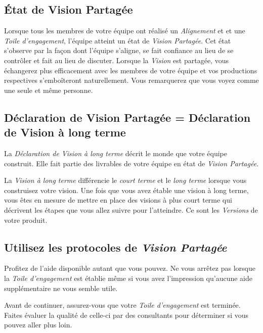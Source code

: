 \documentclass[paper=6in:9in,pagesize=pdftex,headinclude=on,footinclude=on,11pt]{scrbook}
\begin{document}
\subsection{État de Vision Partagée}

Lorsque tous les membres de votre équipe ont réalisé un \emph{Alignement} et et une \emph{Toile d'engagement}, l'équipe atteint un état
de \emph{Vision Partagée}. Cet état s'observe par la façon dont l'équipe s'aligne, se fait confiance au lieu de se contrôler et fait au
lieu de discuter. Lorsque la \emph{Vision} est partagée, vous échangerez plus efficacement avec les membres de votre équipe et vos
productions respectives s'emboîteront naturellement. Vous remarquerez que vous \og{}voyez comme une seule et même personne\fg{}.

\subsection{Déclaration de Vision Partagée = Déclaration de Vision à long terme}

La \emph{Déclaration de Vision à long terme} décrit le monde que votre équipe construit. Elle fait partie des livrables de votre équipe
en état de \emph{Vision Partagée}.

La \emph{Vision à long terme} différencie le \emph{court terme} et le \emph{long terme} lorsque vous construisez votre vision. Une fois
que vous avez étable une vision à long terme, vous êtes en mesure de mettre en place des visions à plus court terme qui décrivent les
étapes que vous allez suivre pour l'atteindre. Ce sont les \emph{Versions} de votre produit.

\subsection{Utilisez les protocoles de \emph{Vision Partagée}}

Profitez de l'aide disponible autant que vous pouvez. Ne vous arrêtez pas lorsque la \emph{Toile d'engagement} est
établie même si vous avez l'impression qu'aucune aide supplémentaire ne vous semble utile.

Avant de continuer, assurez-vous que votre \emph{Toile d'engagement} est terminée. Faites évaluer la qualité de celle-ci par des
consultants pour déterminer si vous pouvez aller plus loin.
\end{document}

